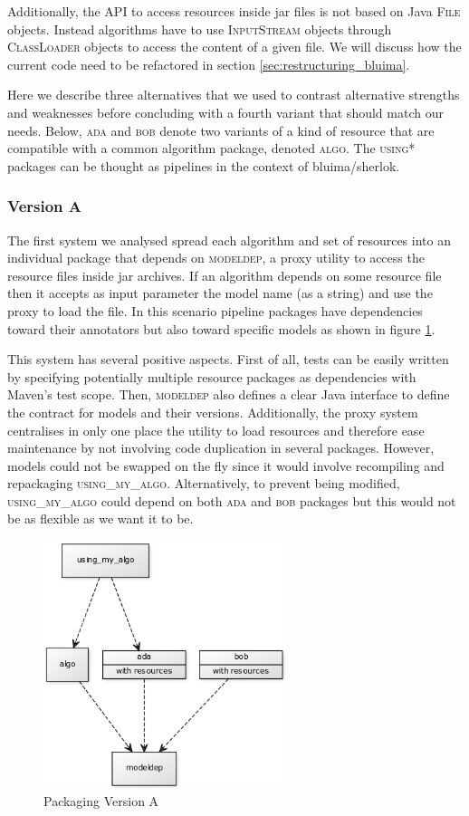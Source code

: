 \documentclass{article}
\newcommand{\id}[1]{\mbox{\textsc{#1}}}
\begin{document}
Additionally, the API to access resources inside jar files is not based on Java \id{File} objects. Instead algorithms have to use \id{InputStream} objects through \id{ClassLoader} objects to access the content of a given file. We will discuss how the current code need to be refactored in section \ref{sec:restructuring_bluima}.

Here we describe three alternatives that we used to contrast alternative strengths and weaknesses before concluding with a fourth variant that should match our needs. Below, \id{ada} and \id{bob} denote two variants of a kind of resource that are compatible with a common algorithm package, denoted \id{algo}. The \id{using*} packages can be thought as pipelines in the context of bluima/sherlok.

\subsubsection{Version A}

The first system we analysed spread each algorithm and set of resources into an individual package that depends on \id{modeldep}, a proxy utility to access the resource files inside jar archives. If an algorithm depends on some resource file then it accepts as input parameter the model name (as a string) and use the proxy to load the file. In this scenario pipeline packages have dependencies toward their annotators but also toward specific models as shown in figure \ref{fig:pkgsysA}.

This system has several positive aspects. First of all, tests can be easily written by specifying potentially multiple resource packages as dependencies with Maven's test scope. Then, \id{modeldep} also defines a clear Java interface to define the contract for models and their versions. Additionally, the proxy system centralises in only one place the utility to load resources and therefore ease maintenance by not involving code duplication in several packages. However, models could not be swapped on the fly since it would involve recompiling and repackaging \id{using\_my\_algo}.  Alternatively, to prevent being modified, \id{using\_my\_algo} could depend on both \id{ada} and \id{bob} packages but this would not be as flexible as we want it to be.

\begin{figure}
\centering
\includegraphics[width=200pt]{res/packaging_version_A.png}
\caption{Packaging Version A}
\label{fig:pkgsysA}
\end{figure}
\end{document}
